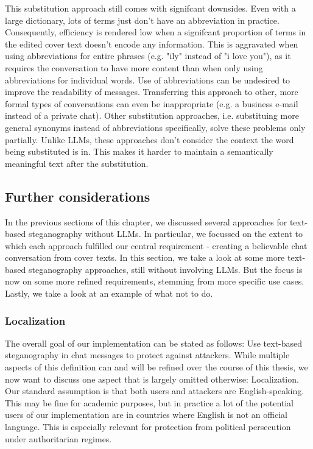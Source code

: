 This substitution approach still comes with signifcant downsides. Even with a large dictionary, lots of terms just don't have an abbreviation in practice. Consequently, efficiency is rendered low when a signifcant proportion of terms in the edited cover text doesn't encode any information. This is aggravated when using abbreviations for entire phrases (e.g. "ily" instead of "i love you"), as it requires the conversation to have more content than when only using abbreviations for individual words. Use of abbreviations can be undesired to improve the readability of messages. Transferring this approach to other, more formal types of conversations can even be inappropriate (e.g. a business e-mail instead of a private chat). Other substitution approaches, i.e. substituing more general synonyms instead of abbreviations specifically, solve these problems only partially. Unlike \glspl{LLM}, these approaches don't consider the context the word being substituted is in. This makes it harder to maintain a semantically meaningful text after the substitution.

\subsection{Further considerations}
\label{sec:furtherConsiderations}
In the previous sections of this chapter, we discussed several approaches for text-based steganography without \glspl{LLM}. In particular, we focussed on the extent to which each approach fulfilled our central requirement - creating a believable chat conversation from cover texts. In this section, we take a look at some more text-based steganography approaches, still without involving \glspl{LLM}. But the focus is now on some more refined requirements, stemming from more specific use cases. Lastly, we take a look at an example of what not to do.

\subsubsection{Localization}
\label{sec:localization}
The overall goal of our implementation can be stated as follows: Use text-based steganography in chat messages to protect against attackers. While multiple aspects of this definition can and will be refined over the course of this thesis, we now want to discuss one aspect that is largely omitted otherwise: Localization. Our standard assumption is that both users and attackers are English-speaking. This may be fine for academic purposes, but in practice a lot of the potential users of our implementation are in countries where English is not an official language. This is especially relevant for protection from political persecution under authoritarian regimes.

